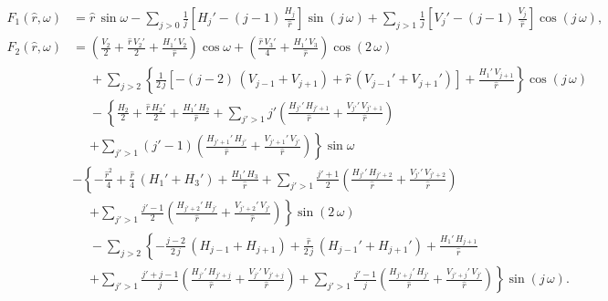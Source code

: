 \documentclass[12pt,prb,aps]{revtex4-1}
\begin{document}
\begin{align}
F_1(\hat{r},\omega)&= \hat{r}\,\sin\omega - \sum_{j>0}\frac{1}{j}\left[H_j'-(j-1)\,\frac{H_j}{\hat{r}}\right]\sin(j\,\omega)
+ \sum_{j>1}\frac{1}{j}\left[V_j'-(j-1)\,\frac{V_j}{\hat{r}}\right]\cos(j\,\omega),\\[0.5ex]
F_2(\hat{r},\omega) &= \left(\frac{V_2}{2}+ \frac{\hat{r}\,V_2'}{2}+\frac{H_1'\,V_2}{\hat{r}}\right)\cos\omega +
\left(\frac{\hat{r}\,V_3'}{4} + \frac{H_1'\,V_3}{\hat{r}}\right)\cos(2\,\omega) \nonumber\\[0.5ex]
&\phantom{=}+\sum_{j>2}\left\{\frac{1}{2\,j}\left[-(j-2)\,(V_{j-1}+V_{j+1})+\hat{r}\,(V_{j-1}'+V_{j+1}')\right]+\frac{H_1'\,V_{j+1}}{\hat{r}}\right\}\cos(j\,\omega)\nonumber\\[0.5ex]
&\phantom{=}-\left\{
\frac{H_2}{2}+\frac{\hat{r}\,H_2'}{2} + \frac{H_1'\,H_2}{\hat{r}}+\sum_{j'>1}j'\left(\frac{H_{j'}'\,H_{j'+1}}{\hat{r}}
+\frac{V_{j'}'\,V_{j'+1}}{\hat{r}}\right)
\right.\nonumber\\[0.5ex]&\phantom{=}\left.
+\sum_{j'>1}(j'-1)\left(\frac{H_{j'+1}'\,H_{j'}}{\hat{r}}
+\frac{V_{j'+1}'\,V_{j'}}{\hat{r}}\right)\right\}\sin\omega\nonumber\\[0.5ex]
&-\left\{
-\frac{\hat{r}^2}{4}+\frac{\hat{r}}{4}\,(H_1'+H_3')+ \frac{H_1'\,H_3}{\hat{r}}+\sum_{j'>1}\frac{j'+1}{2}\left(\frac{H_{j'}'\,H_{j'+2}}{\hat{r}}
+\frac{V_{j'}'\,V_{j'+2}}{\hat{r}}\right)
\right.\nonumber\\[0.5ex]&\phantom{=}\left.
+\sum_{j'>1}\frac{j'-1}{2}\left(\frac{H_{j'+2}'\,H_{j'}}{\hat{r}}
+\frac{V_{j'+2}'\,V_{j'}}{\hat{r}}\right)\right\}\sin(2\,\omega)\nonumber\\[0.5ex]
&\phantom{=} -\sum_{j>2}\left\{-\frac{j-2}{2\,j}\,(H_{j-1}+H_{j+1})+\frac{\hat{r}}{2\,j}\,(H_{j-1}'+H_{j+1}')+\frac{H_1'\,H_{j+1}}{\hat{r}}\right.
\nonumber\\[0.5ex]
&\phantom{=}\left.+\sum_{j'>1}\frac{j'+j-1}{j}\left(\frac{H_{j'}'\,H_{j'+j}}{\hat{r}}
+\frac{V_{j'}'\,V_{j'+j}}{\hat{r}}\right)+\sum_{j'>1}\frac{j'-1}{j}\left(\frac{H_{j'+j}'\,H_{j'}}{\hat{r}}
+\frac{V_{j'+j}'\,V_{j'}}{\hat{r}}\right)\right\}\sin(j\,\omega).
\end{align}
\end{document}
